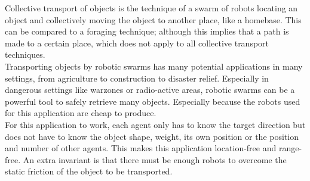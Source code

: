 
Collective transport of objects is the technique of a swarm of robots locating an object and collectively moving the object to another place, like a homebase. This can be compared to a foraging technique; although this implies that a path is made to a certain place, which does not apply to all collective transport techniques. \cite{hoff2010two}  \\
Transporting objects by robotic swarms has many potential applications in many settings, from agriculture to construction to disaster relief. Especially in dangerous settings like warzones or radio-active areas, robotic swarms can be a powerful tool to safely retrieve many objects. Especially because the robots used for this application are cheap to produce. \\
For this application to work, each agent only has to know the target direction but does not have to know the object shape, weight, its own position or the position and number of other agents. This makes this application location-free and range-free. An extra invariant is that there must be enough robots to overcome the static friction of the object to be transported.  \cite{Rubenstein}
